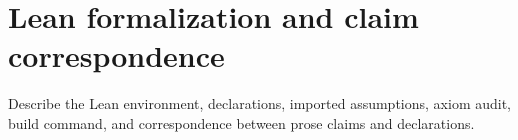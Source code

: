 \section{Lean formalization and claim correspondence}
Describe the Lean environment, declarations, imported assumptions, axiom audit, build command, and correspondence between prose claims and declarations.
